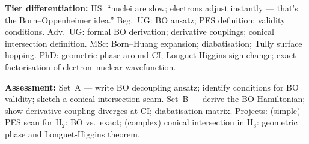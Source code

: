 \documentclass[11pt,a4paper]{article}
\begin{document}
\begin{tcolorbox}[chembox, title={Module~III.1 --- Lecture L02: Born--Oppenheimer Approximation and Adiabaticity}]
\medskip\textbf{Tier differentiation:}
HS: ``nuclei are slow; electrons adjust instantly --- that's the Born--Oppenheimer idea.''
Beg.\ UG: BO ansatz; PES definition; validity conditions.
Adv.\ UG: formal BO derivation; derivative couplings; conical intersection definition.
MSc: Born--Huang expansion; diabatisation; Tully surface hopping.
PhD: geometric phase around CI; Longuet-Higgins sign change; exact factorisation of electron--nuclear wavefunction.

\medskip\textbf{Assessment:}
Set~A --- write BO decoupling ansatz; identify conditions for BO validity; sketch a conical intersection seam.
Set~B --- derive the BO Hamiltonian; show derivative coupling diverges at CI; diabatisation matrix.
Projects: (simple) PES scan for H$_2$: BO vs.\ exact; (complex) conical intersection in H$_3$: geometric phase and Longuet-Higgins theorem.
\end{tcolorbox}

\medskip
\end{document}
